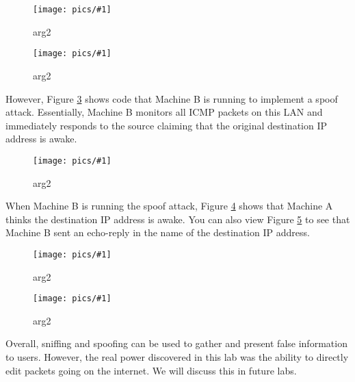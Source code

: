 \documentclass[11pt]{article}
\newcommand{\fig}[2]{ 
\begin{figure}[h]
	\centering
	\caption{#2}
	\texttt{[image: pics/\#1]}
	\label{fig:#1}
\end{figure} 
}
\begin{document}
\fig{task4.1}{arg2}

\fig{task4.2}{arg2}

However, Figure \ref{fig:task4.3} shows code that Machine B is running to implement a spoof attack. Essentially, Machine B monitors all ICMP packets on this LAN and immediately responds to the source claiming that the original destination IP address is awake.

\fig{task4.3}{arg2}

\newpage

When Machine B is running the spoof attack, Figure \ref{fig:task4.4} shows that Machine A thinks the destination IP address is awake. You can also view Figure \ref{fig:task4.5} to see that Machine B sent an echo-reply in the name of the destination IP address.

\fig{task4.4}{arg2}

\fig{task4.5}{arg2} 

Overall, sniffing and spoofing can be used to gather and present false information to users. However, the real power discovered in this lab was the ability to directly edit packets going on the internet. We will discuss this in future labs.
\end{document}
